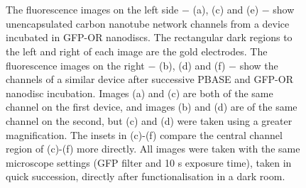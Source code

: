 \documentclass[
  a4paper,
]{scrbook}
\begin{document}
\begin{figure}
\begin{minipage}[t]{0.03\linewidth}
{{}

}

\end{minipage}%
%
\begin{minipage}[t]{0.01\linewidth}

{\centering 

~

}

\end{minipage}%
%
\begin{minipage}[t]{0.45\linewidth}

{\centering 


}

\end{minipage}%
%
\begin{minipage}[t]{0.01\linewidth}

{\centering 

~

}

\end{minipage}%

\caption{\label{fig-PBASE-GFP-ORs}The fluorescence images on the left
side \(-\) (a), (c) and (e) \(-\) show unencapsulated carbon nanotube
network channels from a device incubated in GFP-OR nanodiscs. The
rectangular dark regions to the left and right of each image are the
gold electrodes. The fluorescence images on the right \(-\) (b), (d) and
(f) \(-\) show the channels of a similar device after successive PBASE
and GFP-OR nanodisc incubation. Images (a) and (c) are both of the same
channel on the first device, and images (b) and (d) are of the same
channel on the second, but (c) and (d) were taken using a greater
magnification. The insets in (c)-(f) compare the central channel region
of (c)-(f) more directly. All images were taken with the same microscope
settings (GFP filter and 10 s exposure time), taken in quick succession,
directly after functionalisation in a dark room.}

\end{figure}
\end{document}
